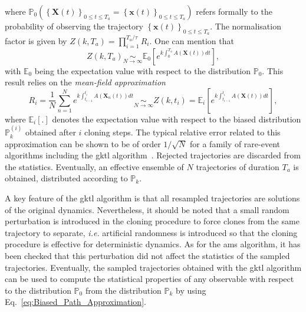 where
$\mathbb{P}_{0}\left(\left\{ \mathbf{X}(t)\right\} _{0\leq t\leq T_{a}} = \left\{ \mathbf{x}(t)\right\} _{0\leq t\leq T_{a}}\right)$ 
refers formally to the probability of observing the trajectory 
$\left\{ \mathbf{x}(t)\right\} _{0\leq t\leq T_{a}}$.
The normalisation factor is given by $Z(k,T_a)=\prod_{i=1}^{T_a/\tau}R_i$.
%
One can mention that
\begin{equation}
\label{eq:mean_field}
Z(k,T_a) \underset{N\to \infty}{\sim} \mathbb{E}_0\left[e^{k\int_{0}^{T_{a}}A(\mathbf{X}(t))dt}\right],
\end{equation}
with $\mathbb{E}_{0}$ being the expectation value with respect to the
distribution $\mathbb{P}_{0}$.
This result relies on the \textit{mean-field approximation}
\begin{equation}
R_{i}=\frac{1}{N}\sum_{n=1}^{N}e^{k\int_{t_{i-1}}^{t_{i}}A(\mathbf{X}_{n}(t))dt}\underset{N\rightarrow\infty}{\sim} Z(k,t_i)= \mathbb{E}_{i}\left[e^{k\int_{t_{i-1}}^{t_{i}}A(\mathbf{X}(t))dt}\right],
\label{eq:Mean_Field_Approximation}
\end{equation}
where $\mathbb{E}_{i}[.]$ denotes the expectation value with respect to the biased distribution $\mathbb{P}_k^{(i)}$ obtained after $i$ cloning steps.
The typical relative error related to this approximation can be shown to be of order $1/\sqrt{N}$ for a family of rare-event algorithms including the \ac{gktl} algorithm~\citep{DelMoralBook,DelMoral2013}.
%
Rejected trajectories are discarded from the statistics.
Eventually, an effective ensemble of $N$ trajectories of duration $T_{a}$ is obtained, distributed according to $\mathbb{P}_{k}$.

 A key feature of the \ac{gktl} algorithm is that all resampled trajectories are solutions of the original dynamics. 
Nevertheless, it should be noted that a small random perturbation is introduced in the cloning procedure to force clones from the same trajectory to separate, \emph{i.e.} artificial randomness is introduced so that the cloning procedure is effective for deterministic dynamics.   
	As for the \ac{ams} algorithm, it has been checked that this perturbation did not affect the statistics of the sampled trajectories.
%
% 
%
%
Eventually, the sampled trajectories obtained with the \ac{gktl} algorithm can be used to compute the statistical properties of any observable with respect to the distribution $\mathbb{P}_{0}$ from the distribution $\mathbb{P}_{k}$ by using Eq.~\eqref{eq:Biased_Path_Approximation}.
%

